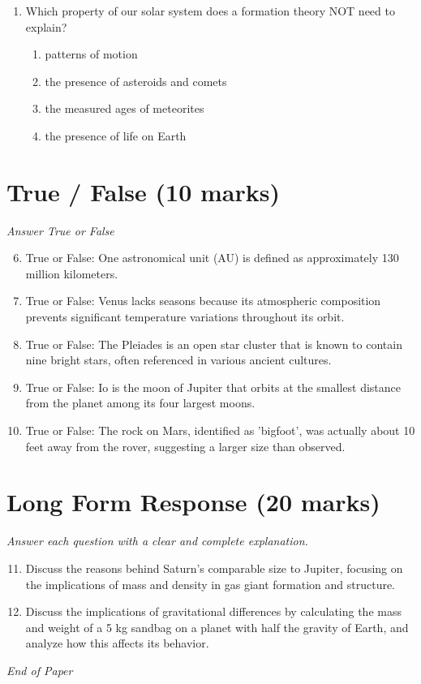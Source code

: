 \documentclass[12pt]{article}
\begin{document}
\begin{enumerate}[label=\arabic*.]
\begin{enumerate}[label=(\alph*)]
    \item the rigid rocky material of the crust and uppermost portion of the mantle.
\end{enumerate}
\item Which property of our solar system does a formation theory NOT need to explain?
\begin{enumerate}[label=(\alph*)]
    \item patterns of motion
    \item the presence of asteroids and comets
    \item the measured ages of meteorites
    \item the presence of life on Earth
\end{enumerate}
\end{enumerate}

\section*{True / False (10 marks)}
\textit{Answer True or False}
\begin{enumerate}[label=\arabic*.]
\setcounter{enumi}{5}
\item True or False: One astronomical unit (AU) is defined as approximately 130 million kilometers.
\item True or False: Venus lacks seasons because its atmospheric composition prevents significant temperature variations throughout its orbit.
\item True or False: The Pleiades is an open star cluster that is known to contain nine bright stars, often referenced in various ancient cultures.
\item True or False: Io is the moon of Jupiter that orbits at the smallest distance from the planet among its four largest moons.
\item True or False: The rock on Mars, identified as 'bigfoot', was actually about 10 feet away from the rover, suggesting a larger size than observed.
\end{enumerate}

\section*{Long Form Response (20 marks)}
\textit{Answer each question with a clear and complete explanation.}
\begin{enumerate}[label=\arabic*.]
\setcounter{enumi}{10}
\item Discuss the reasons behind Saturn's comparable size to Jupiter, focusing on the implications of mass and density in gas giant formation and structure.
\item Discuss the implications of gravitational differences by calculating the mass and weight of a 5 kg sandbag on a planet with half the gravity of Earth, and analyze how this affects its behavior.
\end{enumerate}

\vfill
\noindent\textit{End of Paper}
\end{document}
